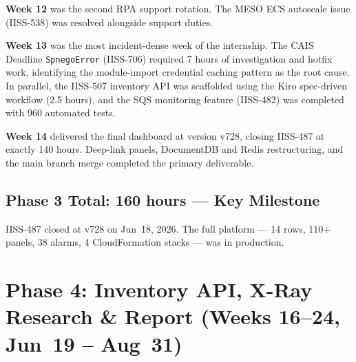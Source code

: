\textbf{Week 12} was the second RPA support rotation. The MESO ECS
autoscale issue (IISS-538) was resolved alongside support duties.

\textbf{Week 13} was the most incident-dense week of the internship.
The CAIS Deadline \texttt{SpnegoError} (IISS-706) required 7 hours of
investigation and hotfix work, identifying the module-import credential
caching pattern as the root cause. In parallel, the IISS-507 inventory
API was scaffolded using the Kiro spec-driven workflow (2.5 hours), and
the SQS monitoring feature (IISS-482) was completed with 960 automated tests.

\textbf{Week 14} delivered the final dashboard at version v728, closing
IISS-487 at exactly 140 hours. Deep-link panels, DocumentDB and Redis
restructuring, and the main branch merge completed the primary deliverable.

\subsection{Phase 3 Total: 160 hours --- Key Milestone}

IISS-487 closed at v728 on Jun~18, 2026. The full platform --- 14 rows,
110+ panels, 38 alarms, 4 CloudFormation stacks --- was in production.

\section{Phase 4: Inventory API, X-Ray Research \& Report (Weeks 16--24, Jun~19 -- Aug~31)}
\label{sec:wb_phase4}

